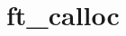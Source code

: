 \chapter{ft\+\_\+calloc}
\hypertarget{md_Documentation_2ft__calloc}{}\label{md_Documentation_2ft__calloc}

